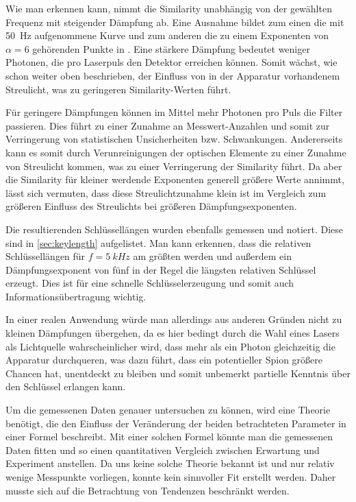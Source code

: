 Wie man erkennen kann, nimmt die Similarity unabhängig von der gewählten
Frequenz mit steigender Dämpfung ab. Eine Ausnahme bildet zum einen die mit
\SI{50}{Hz} aufgenommene Kurve und zum anderen die zu einem Exponenten von $α=6$
gehörenden Punkte in . Eine stärkere Dämpfung bedeutet weniger
Photonen, die pro Laserpuls den Detektor erreichen können. Somit wächst, wie
schon weiter oben beschrieben, der Einfluss von in der Apparatur vorhandenem
Streulicht, was zu geringeren Similarity-Werten führt.

Für geringere Dämpfungen können im Mittel mehr Photonen pro Puls die Filter
passieren. Dies führt zu einer Zunahme an Messwert-Anzahlen und somit zur
Verringerung von statistischen Unsicherheiten bzw. Schwankungen. Andererseits
kann es somit durch Verunreinigungen der optischen Elemente zu einer Zunahme
von Streulicht kommen, was zu einer Verringerung der Similarity führt. Da aber
die Similarity für kleiner werdende Exponenten generell größere Werte annimmt,
lässt sich vermuten, dass diese Streulichtzunahme klein ist im Vergleich zum
größeren Einfluss des Streulichts bei größeren Dämpfungsexponenten.

Die resultierenden Schlüssellängen wurden ebenfalls gemessen und notiert. Diese
sind in \ref{sec:keylength} aufgelistet. Man kann erkennen, dass die relativen 
Schlüssellängen für $f=\SI{5}{kHz}$ am größten werden und außerdem ein
Dämpfungsexponent von fünf in der Regel die längsten relativen Schlüssel erzeugt.
Dies ist für eine schnelle Schlüsselerzeugung und somit auch
Informationsübertragung wichtig.

In einer realen Anwendung würde man allerdings aus anderen Gründen nicht zu
kleinen Dämpfungen übergehen, da es hier bedingt durch die Wahl
eines Lasers als Lichtquelle wahrscheinlicher wird, dass mehr als ein Photon
gleichzeitig die Apparatur durchqueren, was dazu führt, dass ein potentieller
Spion größere Chancen hat, unentdeckt zu bleiben und somit unbemerkt partielle
Kenntnis über den Schlüssel erlangen kann.

Um die gemessenen Daten genauer untersuchen zu können, wird eine Theorie
benötigt, die den Einfluss der Veränderung der beiden betrachteten Parameter in
einer Formel beschreibt. Mit einer solchen Formel könnte man die gemessenen
Daten fitten und so einen quantitativen Vergleich zwischen Erwartung und
Experiment anstellen. Da uns keine solche Theorie bekannt ist und nur relativ
wenige Messpunkte vorliegen, konnte kein sinnvoller Fit erstellt werden. Daher
musste sich auf die Betrachtung von Tendenzen beschränkt werden.

